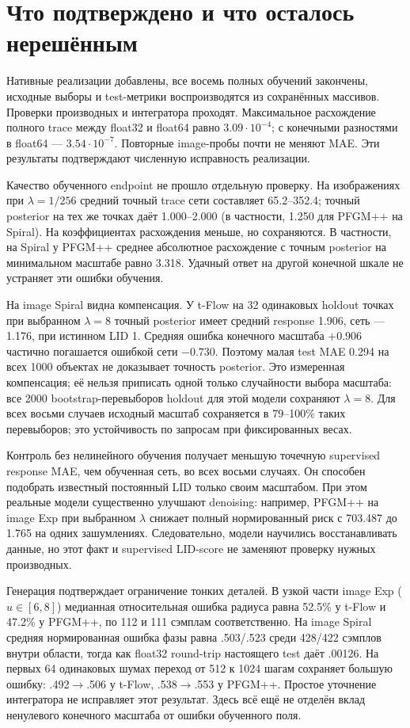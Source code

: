 \section*{Что подтверждено и что осталось нерешённым}
Нативные реализации добавлены, все восемь полных обучений закончены, исходные
выборы и test-метрики воспроизводятся из сохранённых массивов. Проверки
производных и интегратора проходят. Максимальное расхождение полного trace
между float32 и float64 равно $3.09\cdot10^{-4}$; с конечными разностями в
float64 --- $3.54\cdot10^{-7}$. Повторные image-пробы почти не меняют MAE.
Эти результаты подтверждают численную исправность реализации.

Качество обученного endpoint не прошло отдельную проверку. На изображениях
при $\lambda=1/256$ средний точный trace сети составляет 65.2--352.4; точный
posterior на тех же точках даёт 1.000--2.000 (в частности, 1.250 для PFGM++
на Spiral). На коэффициентах расхождения меньше, но сохраняются. В частности,
на Spiral у PFGM++ среднее абсолютное расхождение с точным posterior на
минимальном масштабе равно 3.318. Удачный ответ на другой конечной шкале
не устраняет эти ошибки обучения.

На image Spiral видна компенсация. У t-Flow на 32 одинаковых holdout точках
при выбранном $\lambda=8$ точный posterior имеет средний response 1.906,
сеть --- 1.176, при истинном LID 1. Средняя ошибка конечного масштаба $+0.906$
частично погашается ошибкой сети $-0.730$. Поэтому малая test MAE 0.294 на
всех 1000 объектах не доказывает точность posterior. Это измеренная
компенсация; её нельзя приписать одной только случайности выбора масштаба:
все 2000 bootstrap-перевыборов holdout для этой модели сохраняют $\lambda=8$.
Для всех восьми случаев исходный масштаб сохраняется в 79--100\% таких
перевыборов; это устойчивость по запросам при фиксированных весах.

Контроль без нелинейного обучения получает меньшую точечную supervised response MAE,
чем обученная сеть, во всех восьми случаях. Он способен подобрать известный
постоянный LID только своим масштабом. При этом реальные модели существенно
улучшают denoising: например, PFGM++ на image Exp при выбранном $\lambda$
снижает полный нормированный риск с 703.487 до 1.765 на одних зашумлениях.
Следовательно, модели научились восстанавливать данные, но этот факт и
supervised LID-score не заменяют проверку нужных производных.

Генерация подтверждает ограничение тонких деталей. В узкой части image Exp
($u\in[6,8]$) медианная относительная ошибка радиуса равна 52.5\% у t-Flow
и 47.2\% у PFGM++, по 112 и 111 сэмплам соответственно. На image Spiral
средняя нормированная ошибка фазы равна .503/.523 среди 428/422 сэмплов
внутри области, тогда как float32 round-trip настоящего test даёт .00126.
На первых 64 одинаковых шумах переход от 512 к 1024 шагам сохраняет большую
ошибку: .492$\to$.506 у t-Flow, .538$\to$.553 у PFGM++. Простое уточнение
интегратора не исправляет этот результат. Здесь всё ещё не отделён вклад
ненулевого конечного масштаба от ошибки обученного поля.


